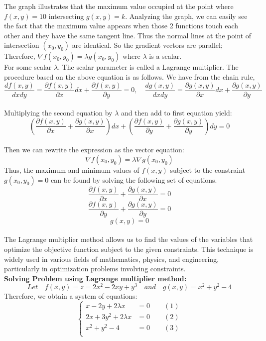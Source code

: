 The graph illustrates that the maximum value occupied at the point where $f(x,y)=10$ intersecting $g(x,y)=k$. Analyzing the graph, we can easily see the fact that the maximum value appears when those 2 functions touch each other and they have the same tangent line. Thus the normal lines at the point of intersection $(x_0,y_0)$ are identical. So the gradient vectors are parallel; Therefore, $\nabla f(x_0,y_0) = \lambda g(x_0,y_0)$ where $\lambda$ is a scalar. \\[6pt]
For some scalar $\lambda$. The scalar parameter is called a Lagrange multiplier. The procedure based on the above equation is as follows. We have from the chain rule,
$$ \dfrac{df(x, y)}{dxdy} = \dfrac{\partial f(x, y)}{\partial x} dx + \dfrac{\partial f(x, y)}{\partial y} = 0,\quad \dfrac{dg(x, y)}{dxdy} = \dfrac{\partial g(x, y)}{\partial x} dx + \dfrac{\partial g(x, y)}{\partial y} $$ \\[6pt]
Multiplying the second equation by $\lambda$ and then add to first equation yield:
$$ \left( \dfrac{\partial f(x, y)}{\partial x} + \dfrac{\partial g(x, y)}{\partial x} \right)dx + \left( \dfrac{\partial f(x, y)}{\partial y} + \dfrac{\partial g(x, y)}{\partial y} \right)dy = 0 $$\\[6pt]
Then we can rewrite the expression as the vector equation:
$$ \nabla f(x_0, y_0) =\lambda \nabla g(x_0, y_0) $$
Thus, the maximum and minimum values of $f(x,y)$ subject to the constraint $g(x_0,y_0)=0$  can be found by solving the following set of equations.
$$ \dfrac{\partial f(x, y)}{\partial x} + \dfrac{\partial g(x, y)}{\partial x} = 0 $$
$$ \dfrac{\partial f(x, y)}{\partial y} + \dfrac{\partial g(x, y)}{\partial y} = 0 $$
$$ g(x, y) = 0 $$\\[6pt]
The Lagrange multiplier method allows us to find the values of the variables that optimize the objective function subject to the given constraints. This technique is widely used in various fields of mathematics, physics, and engineering, particularly in optimization problems involving constraints.\\[6pt]

\textbf{Solving Problem using Lagrange multiplier method:}\\[6pt]
$$ Let \quad  f(x,y)= z = 2x^2-2xy+y^3 \quad and \quad g(x,y)=x^2 + y^2- 4 $$
Therefore, we obtain a system of equations:
\[
\begin{cases}
  x - 2y + 2 \lambda x &= 0 \qquad (1) \\
  2x + 3y^2 + 2 \lambda x &= 0 \qquad (2) \\
  x^2 + y^2 - 4 &= 0 \qquad (3) \\
\end{cases}
\]

